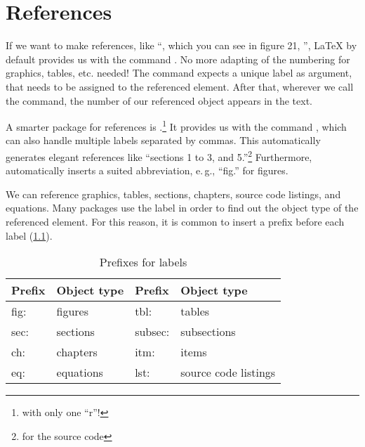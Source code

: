 \chapter{References}
\label{sec:references}

If we want to make references, like \enquote{\textellipsis , which you can see in figure 21, \textellipsis}, \LaTeX{} by default provides us with the command . No more adapting of the numbering for graphics, tables, etc. needed!
The command expects a unique label as argument, that needs to be assigned to 
the referenced element. After that, wherever we call the command, the number of 
our referenced object appears in the text.

A smarter package for references is .\footnote{with only one \enquote{r}!}
It provides us with the command , which can also handle multiple labels separated by commas.
This automatically generates elegant references like \enquote{sections 1 to 3, and 5.}\footnote{for the source code }
Furthermore,  automatically inserts a suited abbreviation, e.\,g., \enquote{fig.} for figures.

We can reference graphics, tables, sections, chapters, source code listings, and equations. 
Many packages use the label in order to find out the object type of the referenced element.
For this reason, it is common to insert a prefix before each label (\cref{lst:reference-prefixes}).

\begin{table}[H]
  \centering
  \begin{tabular}{@{}llll@{}}
    \toprule
    Prefix & Object type & Prefix & Object type \\ \midrule
    fig: & figures & tbl:    & tables            \\ 
    sec: & sections  & subsec: & subsections     \\
    ch:  & chapters     & itm:    & items \\
    eq:  & equations & lst:    & source code listings  \\ \bottomrule
  \end{tabular}
  \caption{Prefixes for labels}
  \label{lst:reference-prefixes}
\end{table}


